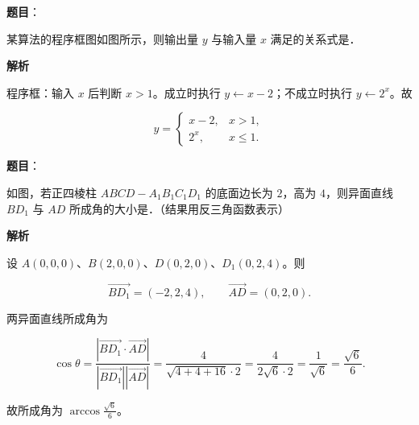 \begin{answer}

\textbf{题目}：

某算法的程序框图如图所示，则输出量 $y$ 与输入量 $x$ 满足的关系式是\gkblank{}．
\nopagebreak[4]
\begin{center}\end{center}
\nopagebreak[4]
\textbf{解析}

程序框：输入 $x$ 后判断 $x>1$。成立时执行 $y\leftarrow x-2$；不成立时执行 $y\leftarrow2^x$。故

\nopagebreak[4]
\[y=\begin{cases}x-2,&x>1,\\2^x,&x\leqslant1.\end{cases}\]


\end{answer}
\begin{answer}

\textbf{题目}：

如图，若正四棱柱 $ABCD-A_1B_1C_1D_1$ 的底面边长为 $2$，高为 $4$，则异面直线 $BD_1$ 与 $AD$ 所成角的大小是\gkblank{}．（结果用反三角函数表示）
\nopagebreak[4]
\begin{center}\end{center}
\nopagebreak[4]
\textbf{解析}

设 $A(0,0,0)$、$B(2,0,0)$、$D(0,2,0)$、$D_1(0,2,4)$。则

\nopagebreak[4]
\[\overrightarrow{BD_1}=(-2,2,4),\qquad \overrightarrow{AD}=(0,2,0).\]

两异面直线所成角为

\nopagebreak[4]
\[\cos\theta=\frac{|\overrightarrow{BD_1}\cdot\overrightarrow{AD}|}{|\overrightarrow{BD_1}||\overrightarrow{AD}|}
=\frac{4}{\sqrt{4+4+16}\cdot2}
=\frac{4}{2\sqrt6\cdot2}=\frac{1}{\sqrt6}=\frac{\sqrt6}{6}.\]

故所成角为 $\arccos\frac{\sqrt6}{6}$。


\end{answer}
